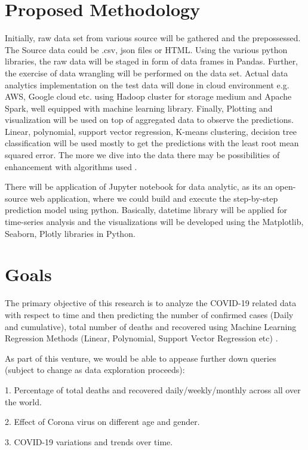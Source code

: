 \documentclass[12pt, a4paper]{article}
\begin{document}
	\section*{Proposed Methodology}
	Initially, raw data set from various source will be gathered and the prepossessed. The Source data could be .csv, json files or HTML. Using the various python libraries, the raw data will be staged in form of data frames in Pandas. Further, the exercise of data wrangling will be performed on the data set. Actual data analytics implementation on the test data will done in cloud environment e.g. AWS, Google cloud etc.  using Hadoop cluster for storage medium and Apache Spark, well equipped with machine learning library. Finally, Plotting and visualization will be used on top of aggregated data to observe the predictions. Linear, polynomial, support vector regression, K-means clustering, decision tree classification will be used mostly to get the predictions with the least root mean squared error. The more we dive into the data there may be possibilities of enhancement with algorithms used \cite{Predictor} \cite{forecasting}.
	
	There will be application of Jupyter notebook for data analytic, as its an open-source web application, where we could build and execute the step-by-step prediction model using python. Basically, datetime library will be applied for time-series analysis and the visualizations will be developed using the Matplotlib, Seaborn, Plotly libraries in Python.
	
	\section*{Goals}
	
	The primary objective of this research is to analyze the COVID-19 related data with respect to time and then predicting the number of confirmed cases (Daily and cumulative), total number of deaths and recovered using Machine Learning Regression Methods (Linear, Polynomial, Support Vector Regression etc) \cite{Predictor}.
	
	As part of this venture, we would be able to appease further down queries (subject to change as data exploration proceeds):
	
	1. Percentage of total deaths and recovered daily/weekly/monthly across all over the world.
	
	2. Effect of Corona virus on different age and gender.
	
	3. COVID-19 variations and trends over time.
	
\end{document}
